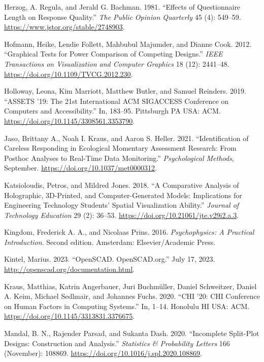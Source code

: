 \documentclass[
  letterpaper,
  DIV=11,
  numbers=noendperiod]{scrartcl}
\newlength{\cslhangindent}
\newenvironment{CSLReferences}[2] %
 {\begin{list}{}{%
  \setlength{\itemindent}{0pt}
  \setlength{\leftmargin}{0pt}
  \setlength{\parsep}{0pt}
  \ifodd #1
   \setlength{\leftmargin}{\cslhangindent}
   \setlength{\itemindent}{-1\cslhangindent}
  \fi
  \setlength{\itemsep}{#2\baselineskip}}}
 {\end{list}}
\begin{document}
\begin{CSLReferences}{1}{0}
Herzog, A. Regula, and Jerald G. Bachman. 1981. {``Effects of
Questionnaire Length on Response Quality.''} \emph{The Public Opinion
Quarterly} 45 (4): 549--59. \url{https://www.jstor.org/stable/2748903}.

Hofmann, Heike, Lendie Follett, Mahbubul Majumder, and Dianne Cook.
2012. {``Graphical Tests for Power Comparison of Competing Designs.''}
\emph{IEEE Transactions on Visualization and Computer Graphics} 18 (12):
2441--48. \url{https://doi.org/10.1109/TVCG.2012.230}.

Holloway, Leona, Kim Marriott, Matthew Butler, and Samuel Reinders.
2019. {``ASSETS '19: The 21st International ACM SIGACCESS Conference on
Computers and Accessibility.''} In, 183--95. Pittsburgh PA USA: ACM.
\url{https://doi.org/10.1145/3308561.3353790}.

Jaso, Brittany A., Noah I. Kraus, and Aaron S. Heller. 2021.
{``Identification of Careless Responding in Ecological Momentary
Assessment Research: {From} Posthoc Analyses to Real-Time Data
Monitoring.''} \emph{Psychological Methods}, September.
\url{https://doi.org/10.1037/met0000312}.

Katsioloudis, Petros, and Mildred Jones. 2018. {``A Comparative Analysis
of Holographic, 3D-Printed, and Computer-Generated Models: Implications
for Engineering Technology Students{'} Spatial Visualization Ability.''}
\emph{Journal of Technology Education} 29 (2): 36--53.
\url{https://doi.org/10.21061/jte.v29i2.a.3}.

Kingdom, Frederick A. A., and Nicolaas Prins. 2016. \emph{Psychophysics:
A Practical Introduction}. Second edition. Amsterdam: Elsevier/Academic
Press.

Kintel, Marius. 2023. {``{OpenSCAD}. {OpenSCAD}.org.''} July 17, 2023.
\url{http://openscad.org/documentation.html}.

Kraus, Matthias, Katrin Angerbauer, Juri Buchmüller, Daniel Schweitzer,
Daniel A. Keim, Michael Sedlmair, and Johannes Fuchs. 2020. {``CHI '20:
CHI Conference on Human Factors in Computing Systems.''} In, 1--14.
Honolulu HI USA: ACM. \url{https://doi.org/10.1145/3313831.3376675}.

Mandal, B. N., Rajender Parsad, and Sukanta Dash. 2020. {``Incomplete
Split-Plot Designs: Construction and Analysis.''} \emph{Statistics \&
Probability Letters} 166 (November): 108869.
\url{https://doi.org/10.1016/j.spl.2020.108869}.


\end{CSLReferences}
\end{document}
